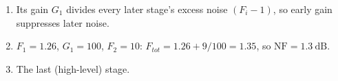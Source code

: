 \begin{enumerate}[leftmargin=1.6em,itemsep=2pt]
\item Its gain $G_1$ divides every later stage's excess noise $(F_i-1)$, so early gain suppresses later noise.
\item $F_1 = 1.26$, $G_1 = 100$, $F_2 = 10$: $F_{tot} = 1.26 + 9/100 = 1.35$, so $\text{NF} = 1.3\ \text{dB}$.
\item The last (high-level) stage.
\end{enumerate}
